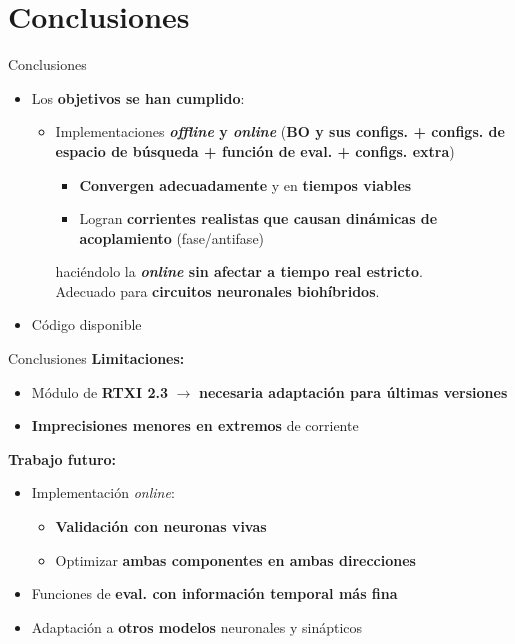 \documentclass[10pt, aspectratio=169]{beamer}
\begin{document}
\section{Conclusiones}



\begin{frame}{Conclusiones}
    \begin{itemize}
        \item Los \textbf{objetivos se han cumplido}:
              \begin{itemize}
                  \item[] Implementaciones \textbf{\textit{offline} y \textit{online}} (\textbf{BO y sus configs. + configs. de espacio de búsqueda + función de eval. + configs. extra})
                        \begin{itemize}
                            \item \textbf{Convergen adecuadamente} y en \textbf{tiempos viables}
                            \item Logran \textbf{corrientes realistas} \textbf{que causan dinámicas de acoplamiento} (fase/antifase)
                        \end{itemize}
                        haciéndolo la \textbf{\textit{online} sin afectar a tiempo real estricto}.\\[0.2em]
                        Adecuado para \textbf{circuitos neuronales biohíbridos}.
              \end{itemize}
        \item Código disponible
    \end{itemize}
\end{frame}


\begin{frame}{Conclusiones}
    \textbf{Limitaciones:}
    \begin{itemize}
        \item Módulo de \textbf{RTXI 2.3} $\to$ \textbf{necesaria adaptación para últimas versiones}
        \item \textbf{Imprecisiones menores en extremos} de corriente
    \end{itemize}
    \vspace{0.8em}
    \textbf{Trabajo futuro:}
    \begin{itemize}
        \item Implementación \textit{online}:
              \begin{itemize}
                  \item \textbf{Validación con neuronas vivas}
                  \item Optimizar \textbf{ambas componentes en ambas direcciones}
              \end{itemize}
        \item Funciones de \textbf{eval. con información temporal más fina}
        \item Adaptación a \textbf{otros modelos} neuronales y sinápticos
    \end{itemize}
\end{frame}
\end{document}
